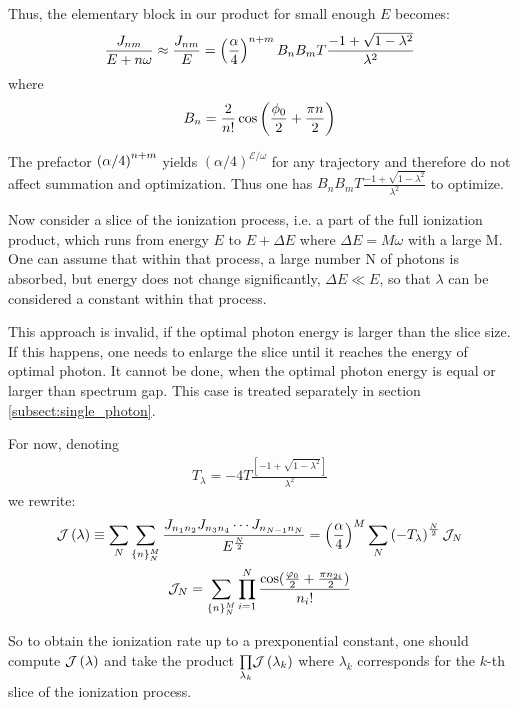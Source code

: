 Thus, the elementary block  in our product for small enough $ E $ becomes:
\begin{gather}
	\frac{J_{nm}}{E+n\omega}
	\approx
	\frac{J_{nm}}{E}
	=
	\left(\frac{\alpha}{4}\right)^{n+m}
	B_n B_m T
	\frac{-1+\sqrt{1-\lambda^2}}{\lambda^2}
\end{gather}
where
\begin{gather}
	B_n=
	\frac{2}{n!}\cos\left(\frac{\phi_0}{2}+\frac{\pi n}{2}\right)
\end{gather}

The prefactor $  \left(\alpha/4\right)^{n+m} $ yields $ (\alpha/4)^{\mathcal{E}/\omega} $ for any trajectory and therefore do not affect summation and optimization. Thus one has $ B_{n}B_{m}T\frac{-1+\sqrt{1-\lambda^{2}}}{\lambda^{2}} $ to optimize.

Now consider a slice of the ionization process, i.e. a part of the full ionization product, which runs from energy $ E $ to $ E+\Delta E $ where $ \Delta E=M\omega $ with a large M. One can assume that within that process, a large number N of photons is absorbed, but energy does not change significantly, $ \Delta E\ll E $, so that $ \lambda $ can be considered a constant within that process. 

This approach is invalid, if the optimal photon energy is larger  than the slice size. If this happens, one needs to enlarge the slice until it reaches the energy of optimal photon. It cannot be done, when the optimal photon energy is equal or larger than spectrum gap. This case is treated separately in section \ref{subsect:single_photon}.

For now, denoting
\begin{gather}
\label{T_lambda_def}
	T_{\lambda}=-4T\frac{\left[-1+\sqrt{1-\lambda^{2}}\right]}{\lambda^{2}}
\end{gather}
we rewrite:
\begin{gather}
\label{ionization_super_formula_sum}
\mathcal{J}\left(\lambda\right)
\equiv
\sum_N
\sum_{\{n\}_{N}^{M}}\frac{	J_{n_1 n_{2}}
	J_{n_3 n_{4}}
	\cdots
	J_{n_{N-1}n_{N}}}{E^{\frac{N}{2}}}
=
\left(\frac{\alpha}{4}\right)^{M}
\sum_N
\left(-T_{\lambda}\right)^{\frac{N}{2}}
\mathcal{J}_N
\\
\label{ionization_super_formula}
\mathcal{J}_N
=
\sum_{\{n\}_{N}^{M}}\prod_{i=1}^{N}\frac{\cos(\frac{\varphi_{0}}{2}+\frac{\pi n_{2i}}{2})}{n_{i}!}
\end{gather}

So to obtain the ionization rate up to a prexponential constant, one should compute $ \mathcal{J}\left(\lambda\right) $ and take the product 
$ \underset{\lambda_k}{\prod} \mathcal{J}\left(\lambda_k\right)$ where $ \lambda_k $ corresponds for the $ k $-th slice of the ionization process.  
